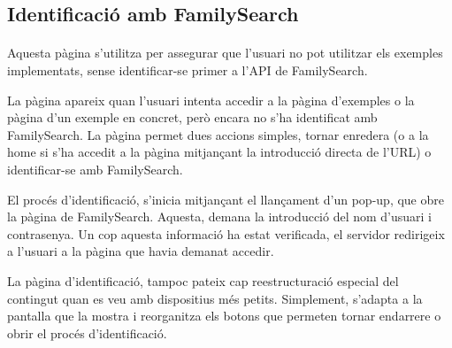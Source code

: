 \subsection{Identificació amb FamilySearch}

    \paragraph{}
    Aquesta pàgina s'utilitza per assegurar que l'usuari no pot utilitzar els exemples implementats, sense identificar-se primer a l’API de FamilySearch.

    La pàgina apareix quan l'usuari intenta accedir a la pàgina d'exemples o la pàgina d'un exemple en concret, però encara no s’ha identificat amb FamilySearch. La pàgina permet dues accions simples, tornar enredera (o a la home si s'ha accedit a la pàgina mitjançant la introducció directa de l'URL) o identificar-se amb FamilySearch.

    El procés d'identificació, s'inicia mitjançant el llançament d'un pop-up, que obre la pàgina de FamilySearch. Aquesta, demana la introducció del nom d'usuari i contrasenya. Un cop aquesta informació ha estat verificada, el servidor redirigeix a l'usuari a la pàgina que havia demanat accedir.

    La pàgina d'identificació, tampoc pateix cap reestructuració especial del contingut quan es veu amb dispositius més petits. Simplement, s'adapta a la pantalla que la mostra i reorganitza els botons que permeten tornar endarrere o obrir el procés d’identificació.
